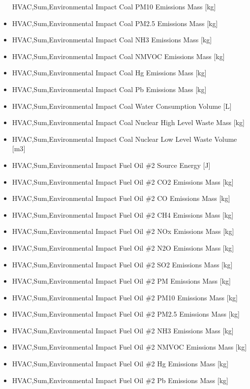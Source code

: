 \begin{itemize}
  HVAC,Sum,Environmental Impact Coal PM10 Emissions Mass {[}kg{]}
\item
  HVAC,Sum,Environmental Impact Coal PM2.5 Emissions Mass {[}kg{]}
\item
  HVAC,Sum,Environmental Impact Coal NH3 Emissions Mass {[}kg{]}
\item
  HVAC,Sum,Environmental Impact Coal NMVOC Emissions Mass {[}kg{]}
\item
  HVAC,Sum,Environmental Impact Coal Hg Emissions Mass {[}kg{]}
\item
  HVAC,Sum,Environmental Impact Coal Pb Emissions Mass {[}kg{]}
\item
  HVAC,Sum,Environmental Impact Coal Water Consumption Volume {[}L{]}
\item
  HVAC,Sum,Environmental Impact Coal Nuclear High Level Waste Mass {[}kg{]}
\item
  HVAC,Sum,Environmental Impact Coal Nuclear Low Level Waste Volume {[}m3{]}
\item
  HVAC,Sum,Environmental Impact Fuel Oil \#2 Source Energy {[}J{]}
\item
  HVAC,Sum,Environmental Impact Fuel Oil \#2 CO2 Emissions Mass {[}kg{]}
\item
  HVAC,Sum,Environmental Impact Fuel Oil \#2 CO Emissions Mass {[}kg{]}
\item
  HVAC,Sum,Environmental Impact Fuel Oil \#2 CH4 Emissions Mass {[}kg{]}
\item
  HVAC,Sum,Environmental Impact Fuel Oil \#2 NOx Emissions Mass {[}kg{]}
\item
  HVAC,Sum,Environmental Impact Fuel Oil \#2 N2O Emissions Mass {[}kg{]}
\item
  HVAC,Sum,Environmental Impact Fuel Oil \#2 SO2 Emissions Mass {[}kg{]}
\item
  HVAC,Sum,Environmental Impact Fuel Oil \#2 PM Emissions Mass {[}kg{]}
\item
  HVAC,Sum,Environmental Impact Fuel Oil \#2 PM10 Emissions Mass {[}kg{]}
\item
  HVAC,Sum,Environmental Impact Fuel Oil \#2 PM2.5 Emissions Mass {[}kg{]}
\item
  HVAC,Sum,Environmental Impact Fuel Oil \#2 NH3 Emissions Mass {[}kg{]}
\item
  HVAC,Sum,Environmental Impact Fuel Oil \#2 NMVOC Emissions Mass {[}kg{]}
\item
  HVAC,Sum,Environmental Impact Fuel Oil \#2 Hg Emissions Mass {[}kg{]}
\item
  HVAC,Sum,Environmental Impact Fuel Oil \#2 Pb Emissions Mass {[}kg{]}

\end{itemize}
